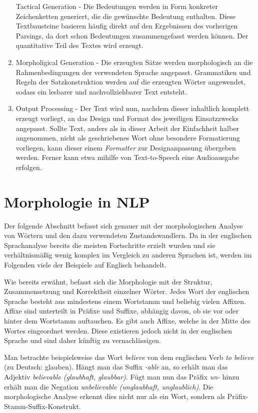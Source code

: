 \documentclass[12pt]{report}
\begin{document}
\begin{enumerate}
Tactical Generation - Die Bedeutungen werden in Form konkreter Zeichenketten generiert, die die gewünschte Bedeutung enthalten. Diese Textbausteine basieren häufig direkt auf den Ergebnissen des vorherigen Parsings, da dort schon Bedeutungen zusammengefasst werden können. Der quantitative Teil des Textes wird erzeugt.
\item
Morpholigical Generation - Die erzeugten Sätze werden morphologisch an die Rahmenbedingungen der verwendeten Sprache angepasst. Grammatiken und Regeln der Satzkonstruktion werden auf die erzeugten Wörter angewendet, sodass ein lesbarer und nachvollziehbarer Text entsteht.
\item
Output Processing - Der Text wird nun, nachdem dieser inhaltlich komplett erzeugt vorliegt, an das Design und Format des jeweiligen Einsatzzwecks angepasst. Sollte Text, anders als in dieser Arbeit der Einfachheit halber angenommen, nicht als geschriebenes Wort ohne besondere Formatierung vorliegen, kann dieser einem \textit{Formatter} zur Designanpassung übergeben werden. Ferner kann etwa mihilfe von Text-to-Speech eine Audioausgabe erfolgen. 
\end{enumerate}

\section{Morphologie in NLP}
Der folgende Abschnitt befasst sich genauer mit der morphologischen Analyse von Wörtern und den dazu verwendeten Zustandswandlern. Da in der englischen Sprachanalyse bereits die meisten Fortschritte erzielt wurden und sie verhältnismäßig wenig komplex im Vergleich zu anderen Sprachen ist, werden im Folgenden viele der Beispiele auf Englisch behandelt. 

Wie bereits erwähnt, befasst sich die Morphologie mit der Struktur, Zusammensetzung und Korrektheit einzelner Wörter. Jedes Wort der englischen Sprache besteht aus mindestens einem Wortstamm und beliebig vielen Affixen. Affixe sind unterteilt in Präfixe und Suffixe, abhängig davon, ob sie vor oder hinter dem Wortstamm auftauchen. Es gibt auch Affixe, welche in der Mitte des Wortes eingeordnet werden. Diese existieren jedoch nicht in der englischen Sprache und sind daher künftig zu vernachlässigen.

Man betrachte beispielsweise das Wort \textit{\glqq  believe\grqq{}} von dem englischen Verb \textit{\glqq  to believe\grqq{}} (zu Deutsch: \glqq  glauben\grqq{}). Hängt man das Suffix \textit{\glqq  -able\grqq{}} an, so erhält man das Adjektiv \textit{\glqq  believable\grqq{} (\glqq  glaubhaft\grqq{}, \glqq  glaubbar\grqq{})}. Fügt man nun das Präfix \textit{\glqq  un-\grqq{}} hinzu erhält man die Negation \textit{\glqq  unbelievable\grqq{} (\glqq  unglaubhaft\grqq{}, \glqq  unglaublich\grqq{})}. Die morphologische Analyse erkennt dies nicht nur als ein Wort, sondern als Präfix-Stamm-Suffix-Konstrukt.
\end{document}
